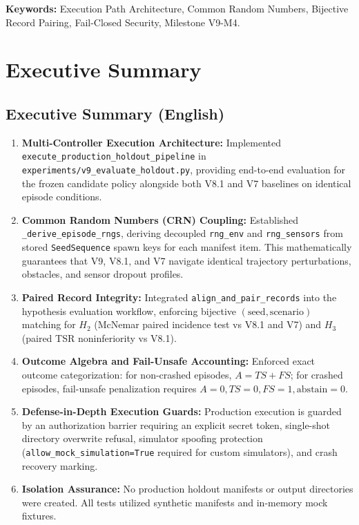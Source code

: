 \documentclass[10pt,a4paper]{article}
\begin{document}
\vspace{6pt}
\noindent \textbf{Keywords:} Execution Path Architecture, Common Random Numbers, Bijective Record Pairing, Fail-Closed Security, Milestone V9-M4.

\section{Executive Summary}

\subsection{Executive Summary (English)}
\begin{enumerate}
    \item \textbf{Multi-Controller Execution Architecture:} Implemented \texttt{execute\_production\_holdout\_pipeline} in \texttt{experiments/v9\_evaluate\_holdout.py}, providing end-to-end evaluation for the frozen candidate policy alongside both V8.1 and V7 baselines on identical episode conditions.
    \item \textbf{Common Random Numbers (CRN) Coupling:} Established \texttt{\_derive\_episode\_rngs}, deriving decoupled \texttt{rng\_env} and \texttt{rng\_sensors} from stored \texttt{SeedSequence} spawn keys for each manifest item. This mathematically guarantees that V9, V8.1, and V7 navigate identical trajectory perturbations, obstacles, and sensor dropout profiles.
    \item \textbf{Paired Record Integrity:} Integrated \texttt{align\_and\_pair\_records} into the hypothesis evaluation workflow, enforcing bijective $(\text{seed}, \text{scenario})$ matching for $H_2$ (McNemar paired incidence test vs V8.1 and V7) and $H_3$ (paired TSR noninferiority vs V8.1).
    \item \textbf{Outcome Algebra and Fail-Unsafe Accounting:} Enforced exact outcome categorization: for non-crashed episodes, $A = TS + FS$; for crashed episodes, fail-unsafe penalization requires $A=0, TS=0, FS=1, \text{abstain}=0$.
    \item \textbf{Defense-in-Depth Execution Guards:} Production execution is guarded by an authorization barrier requiring an explicit secret token, single-shot directory overwrite refusal, simulator spoofing protection (\texttt{allow\_mock\_simulation=True} required for custom simulators), and crash recovery marking.
    \item \textbf{Isolation Assurance:} No production holdout manifests or output directories were created. All tests utilized synthetic manifests and in-memory mock fixtures.
\end{enumerate}
\end{document}
